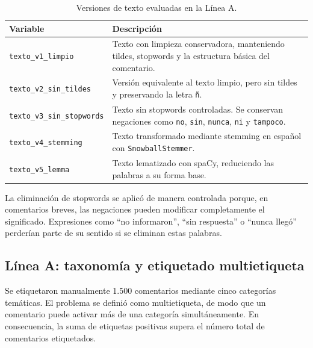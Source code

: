 \documentclass[12pt,a4paper]{article}
\newcommand{\code}[1]{\nolinkurl{#1}}
\begin{document}
\begin{table}[htbp]
\centering
\caption{Versiones de texto evaluadas en la Línea A.}
\label{tab:variantes_texto_a}
\scriptsize
\begin{tabularx}{\textwidth}{@{}P{4.4cm}Y@{}}
\toprule
\textbf{Variable} & \textbf{Descripción} \\
\midrule
\code{texto\_v1\_limpio} & Texto con limpieza conservadora, manteniendo tildes, stopwords y la estructura básica del comentario. \\
\addlinespace
\code{texto\_v2\_sin\_tildes} & Versión equivalente al texto limpio, pero sin tildes y preservando la letra \code{ñ}. \\
\addlinespace
\code{texto\_v3\_sin\_stopwords} & Texto sin stopwords controladas. Se conservan negaciones como \code{no}, \code{sin}, \code{nunca}, \code{ni} y \code{tampoco}. \\
\addlinespace
\code{texto\_v4\_stemming} & Texto transformado mediante stemming en español con \code{SnowballStemmer}. \\
\addlinespace
\code{texto\_v5\_lemma} & Texto lematizado con spaCy, reduciendo las palabras a su forma base. \\
\bottomrule
\end{tabularx}
\end{table}
\FloatBarrier

La eliminación de stopwords se aplicó de manera controlada porque, en comentarios breves, las negaciones pueden modificar completamente el significado. Expresiones como ``no informaron'', ``sin respuesta'' o ``nunca llegó'' perderían parte de su sentido si se eliminan estas palabras.

\subsection{Línea A: taxonomía y etiquetado multietiqueta}

Se etiquetaron manualmente 1.500 comentarios mediante cinco categorías temáticas. El problema se definió como multietiqueta, de modo que un comentario puede activar más de una categoría simultáneamente. En consecuencia, la suma de etiquetas positivas supera el número total de comentarios etiquetados.
\end{document}

